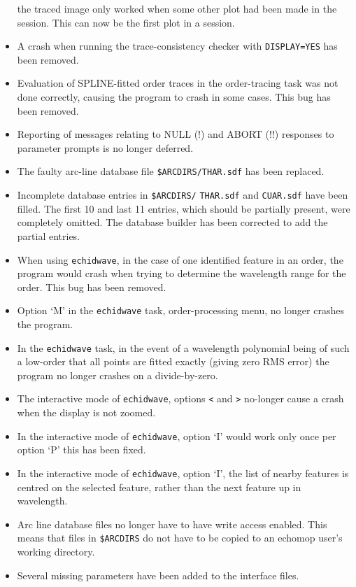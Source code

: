 \documentclass[twoside,11pt]{article}
\renewcommand{\_}{\texttt{\symbol{95}}}
\begin{document}
\begin{itemize}
   the traced image only worked when some other plot had been made in
   the session.  This can now be the first plot in a session.
\item A crash when running the trace-consistency checker with
   {\tt DISPLAY=YES} has been removed.
\item Evaluation of SPLINE-fitted order traces in the order-tracing task
   was not done correctly, causing the program to crash in some cases.
   This bug has been removed.
\item Reporting of messages relating to NULL (!) and ABORT (!!) responses
   to parameter prompts is no longer deferred.
\item The faulty arc-line database file \texttt{\$ARCDIRS/THAR.sdf}
   has been replaced.
\item Incomplete database entries in \texttt{\$ARCDIRS/} \texttt{THAR.sdf} and
   \texttt{CUAR.sdf}
   have been filled.  The first 10 and last 11 entries, which should be
   partially present, were completely omitted.  The database builder has
   been corrected to add the partial entries.
\item When using {\tt ech\_idwave}, in the case of one identified feature in an
   order, the program would crash when trying to determine the wavelength
   range for the order.  This bug has been removed.
\item Option `M' in the {\tt ech\_idwave} task, order-processing menu,
   no longer crashes the program.
\item In the {\tt ech\_idwave} task, in the event of a wavelength polynomial
   being
   of such a low-order that all points are fitted exactly (giving zero
   RMS error) the program no longer crashes on a divide-by-zero.
\item The interactive mode of {\tt ech\_idwave}, options \texttt{<} and \texttt{>}
   no-longer cause a crash when the display is not zoomed.
\item In the interactive mode of {\tt ech\_idwave}, option `I' would work only
   once per option `P' this has been fixed.
\item In the interactive mode of {\tt ech\_idwave}, option `I', the list of
   nearby
   features is centred on the selected feature, rather than the next
   feature up in wavelength.
\item Arc line database files no longer have to have write access enabled.
   This means that files in \texttt{\$ARCDIRS} do not have to be copied to an
   {\sc echomop} user's working directory.
\item Several missing parameters have been added to the interface files.

\end{itemize}
\end{document}
